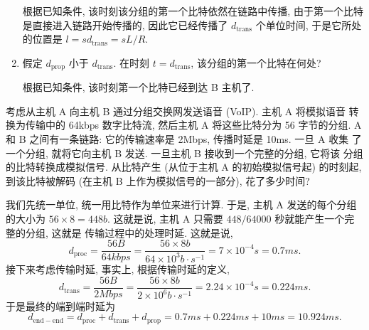 \documentclass[10pt,UTF8]{ctexbook} %
\begin{document}
\begin{example}
\begin{enumerate}[label={$\left.\mathrm{\alph*}\right)$}, itemsep=0pt]
\begin{sol}
            根据已知条件, 该时刻该分组的第一个比特依然在链路中传播,
            由于第一个比特是直接进入链路开始传播的, 因此它已经传播了
            $d_\mathrm{trans}$ 个单位时间, 于是它所处的位置是
            $l = sd_\mathrm{trans} = sL/R$.
        \end{sol}
        \item 假定 $d_\mathrm{prop}$ 小于 $d_\mathrm{trans}$. 
        在时刻 $t = d_\mathrm{trans}$, 该分组的第一个比特在何处?
        \begin{sol}
            根据已知条件, 该时刻第一个比特已经到达 B 主机了.
        \end{sol}
    \end{enumerate}
\end{example}

\begin{example}
    考虑从主机 A 向主机 B 通过分组交换网发送语音 (VoIP). 主机 A 将模拟语音
    转换为传输中的 64kbps 数字比特流, 然后主机 A 将这些比特分为 56 字节的分组.
    A 和 B 之间有一条链路: 它的传输速率是 2Mbps, 传播时延是 10ms. 一旦 A 收集
    了一个分组, 就将它向主机 B 发送. 一旦主机 B 接收到一个完整的分组, 它将该
    分组的比特转换成模拟信号. 从比特产生 (从位于主机 A 的初始模拟信号起) 的时刻起,
    到该比特被解码 (在主机 B 上作为模拟信号的一部分), 花了多少时间?
    \begin{sol}
        我们先统一单位, 统一用比特作为单位来进行计算. 于是, 主机 A 发送的每个分组
        的大小为 $56 \times 8 = 448\si{b}$.
        这就是说, 主机 A 只需要 $448/64000$ 秒就能产生一个完整的分组, 这就是
        传输过程中的处理时延. 这就是说,
        \[ d_\mathrm{proc} 
        = \dfrac{56\si{B}}{64 \si{kbps}}
        = \dfrac{56 \times 8 \si{b}}{64 \times 10^3 \si{b \cdot s^{-1}}}
        = 7 \times 10^{-4} \si{s} =0.7 \si{ms}. \]
        \newline 接下来考虑传输时延, 事实上, 根据传输时延的定义,
        \[ d_\mathrm{trans} 
        = \dfrac{56\si{B}}{2\si{Mbps}}
        = \dfrac{56 \times 8 \si{b}}{2 \times 10^6 \si{b \cdot s^{-1}}}
        = 2.24 \times 10^{-4} \si{s} = 0.224 \si{ms}. \]
        \newline 于是最终的端到端时延为
        \[ d_\mathrm{end-end} = d_\mathrm{proc} + d_\mathrm{trans} +
        d_\mathrm{prop} = 0.7\si{ms} + 0.224 \si{ms} + 10\si{ms}
        = 10.924 \si{ms}. \]
    \end{sol}
\end{example}
\end{document}
